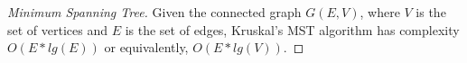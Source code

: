 \documentclass{scrartcl}
\begin{document}
\begin{flushleft}
\begin{proof}[Minimum Spanning Tree]
        Given the connected graph $G(E, V)$, where $V$ is the set of vertices and $E$ is the set of
        edges, Kruskal's MST algorithm has complexity $O(E * lg(E))$ or equivalently, $O(E *
        lg(V))$.
    \end{proof}

\end{flushleft}
\end{document}
